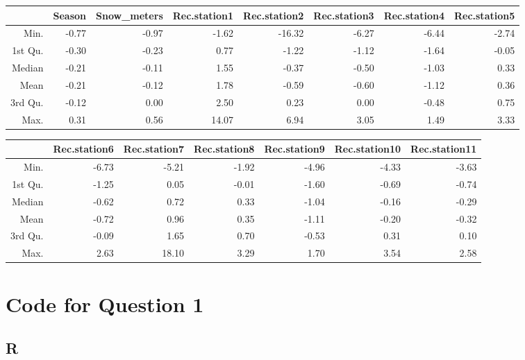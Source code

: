 \documentclass[10pt]{extarticle}
\begin{document}
\begin{table}[ht]
	\centering
	\begin{tabular}{r|rrrrrrr}
		\hline
		& Season & Snow\_meters & Rec.station1 & Rec.station2 & Rec.station3 & Rec.station4 & Rec.station5 \\ 
		\hline
		Min. & -0.77 & -0.97 & -1.62 & -16.32 & -6.27 & -6.44 & -2.74 \\ 
		1st Qu. & -0.30 & -0.23 & 0.77 & -1.22 & -1.12 & -1.64 & -0.05 \\ 
		Median & -0.21 & -0.11 & 1.55 & -0.37 & -0.50 & -1.03 & 0.33 \\ 
		Mean & -0.21 & -0.12 & 1.78 & -0.59 & -0.60 & -1.12 & 0.36 \\ 
		3rd Qu. & -0.12 & 0.00 & 2.50 & 0.23 & 0.00 & -0.48 & 0.75 \\ 
		Max. & 0.31 & 0.56 & 14.07 & 6.94 & 3.05 & 1.49 & 3.33 \\ 
		\hline
	\end{tabular}

\vspace{1em}

	\begin{tabular}{r|rrrrrr}
		\hline
		& Rec.station6 & Rec.station7 & Rec.station8 & Rec.station9 & Rec.station10 & Rec.station11 \\ 
		\hline
		Min. & -6.73 & -5.21 & -1.92 & -4.96 & -4.33 & -3.63 \\ 
		1st Qu. & -1.25 & 0.05 & -0.01 & -1.60 & -0.69 & -0.74 \\ 
		Median & -0.62 & 0.72 & 0.33 & -1.04 & -0.16 & -0.29 \\ 
		Mean & -0.72 & 0.96 & 0.35 & -1.11 & -0.20 & -0.32 \\ 
		3rd Qu. & -0.09 & 1.65 & 0.70 & -0.53 & 0.31 & 0.10 \\ 
		Max. & 2.63 & 18.10 & 3.29 & 1.70 & 3.54 & 2.58 \\ 
		\hline
	\end{tabular}
\end{table}
\printbibliography

\newpage

\appendix

\section{Code for Question 1}
\subsection{R}
\label{code:main_1}
\end{document}
